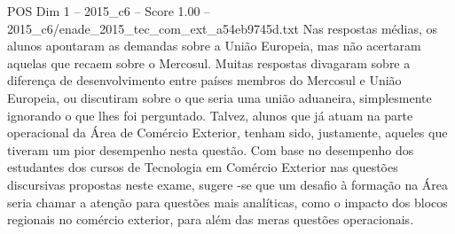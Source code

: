 \begin{textsample}{POS Dim 1 – 2015\_c6 – Score 1.00 – 2015\_c6/enade\_2015\_tec\_com\_ext\_a54eb9745d.txt}
Nas respostas médias, os alunos apontaram as demandas sobre a União Europeia, mas não acertaram aquelas que recaem sobre o Mercosul.
Muitas respostas divagaram sobre a diferença de desenvolvimento entre países membros do Mercosul e União Europeia, ou discutiram sobre o que seria uma união aduaneira, simplesmente ignorando o que lhes foi perguntado.
Talvez, alunos que já atuam na parte operacional da Área de Comércio Exterior, tenham sido, justamente, aqueles que tiveram um pior desempenho nesta questão.
Com base no desempenho dos estudantes dos cursos de Tecnologia em Comércio Exterior nas questões discursivas propostas neste exame, sugere -se que um desafio à formação na Área seria chamar a atenção para questões mais analíticas, como o impacto dos blocos regionais no comércio exterior, para além das meras questões operacionais.

\end{textsample}
